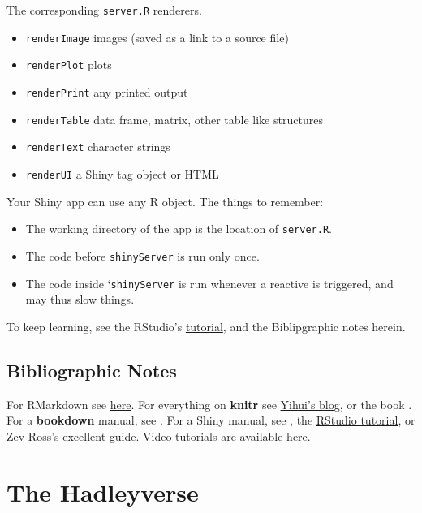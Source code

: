 \documentclass[]{book}
\providecommand{\tightlist}{%
  \setlength{\itemsep}{0pt}\setlength{\parskip}{0pt}}
\theoremstyle{definition}
\theoremstyle{definition}
\theoremstyle{remark}
\begin{document}
The corresponding \texttt{server.R} renderers.

\begin{itemize}
\tightlist
\item
  \texttt{renderImage} images (saved as a link to a source file)
\item
  \texttt{renderPlot} plots
\item
  \texttt{renderPrint} any printed output
\item
  \texttt{renderTable} data frame, matrix, other table like structures
\item
  \texttt{renderText} character strings
\item
  \texttt{renderUI} a Shiny tag object or HTML
\end{itemize}

Your Shiny app can use any R object. The things to remember:

\begin{itemize}
\tightlist
\item
  The working directory of the app is the location of \texttt{server.R}.
\item
  The code before \texttt{shinyServer} is run only once.
\item
  The code inside `\texttt{shinyServer} is run whenever a reactive is
  triggered, and may thus slow things.
\end{itemize}

To keep learning, see the RStudio's
\href{http://shiny.rstudio.com/tutorial/}{tutorial}, and the
Biblipgraphic notes herein.

\section{Bibliographic Notes}\label{bibliographic-notes-9}

For RMarkdown see \href{http://rmarkdown.rstudio.com/}{here}. For
everything on \textbf{knitr} see
\href{https://yihui.name/knitr/}{Yihui's blog}, or the book
\citet{xie2015dynamic}. For a \textbf{bookdown} manual, see
\citet{xie2016bookdown}. For a Shiny manual, see \citet{shiney}, the
\href{http://shiny.rstudio.com/tutorial/}{RStudio tutorial}, or
\href{http://zevross.com/blog/2016/04/19/r-powered-web-applications-with-shiny-a-tutorial-and-cheat-sheet-with-40-example-apps/}{Zev
Ross's} excellent guide. Video tutorials are available
\href{https://www.rstudio.com/resources/webinars/shiny-developer-conference/}{here}.

\chapter{The Hadleyverse}\label{hadley}
\end{document}
